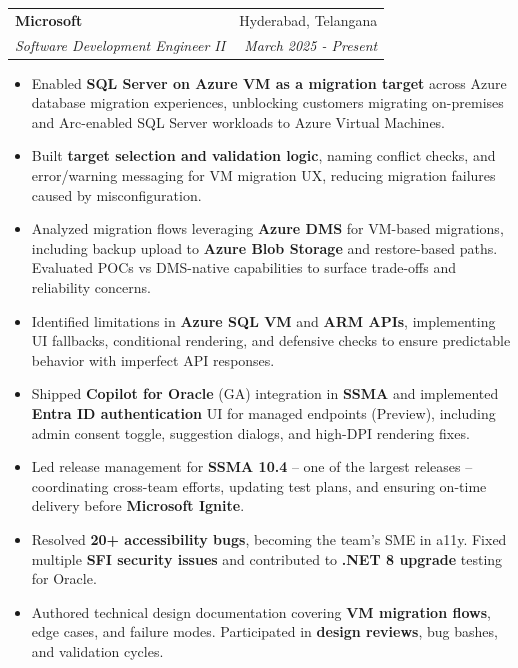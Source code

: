 \documentclass[letterpaper,11pt]{article}
\makeatletter
\newcommand{\resumeItem}[1]{
  \item\small{
    {#1 \vspace{-2pt}}
  }
}
\newcommand{\resumeSubheading}[4]{
  \vspace{-2pt}\item
    \begin{tabular*}{0.97\textwidth}[t]{l@{\extracolsep{\fill}}r}
      \textbf{#1} & #2 \\
      \textit{\small#3} & \textit{\small #4} \\
    \end{tabular*}\vspace{-7pt}
}
\newcommand{\resumeItemListStart}{\begin{itemize}}
\newcommand{\resumeItemListEnd}{\end{itemize}\vspace{-5pt}}
\makeatother
\begin{document}
    \resumeSubheading
          {Microsoft}{Hyderabad, Telangana}
          {Software Development Engineer II}{March 2025 - Present}
          \resumeItemListStart
            \resumeItem{Enabled \textbf{SQL Server on Azure VM as a migration target} across Azure database migration experiences, unblocking customers migrating on-premises and Arc-enabled SQL Server workloads to Azure Virtual Machines.}
            \resumeItem{Built \textbf{target selection and validation logic}, naming conflict checks, and error/warning messaging for VM migration UX, reducing migration failures caused by misconfiguration.}
            \resumeItem{Analyzed migration flows leveraging \textbf{Azure DMS} for VM-based migrations, including backup upload to \textbf{Azure Blob Storage} and restore-based paths. Evaluated POCs vs DMS-native capabilities to surface trade-offs and reliability concerns.}
            \resumeItem{Identified limitations in \textbf{Azure SQL VM} and \textbf{ARM APIs}, implementing UI fallbacks, conditional rendering, and defensive checks to ensure predictable behavior with imperfect API responses.}
            \resumeItem{Shipped \textbf{Copilot for Oracle} (GA) integration in \textbf{SSMA} and implemented \textbf{Entra ID authentication} UI for managed endpoints (Preview), including admin consent toggle, suggestion dialogs, and high-DPI rendering fixes.}
            \resumeItem{Led release management for \textbf{SSMA 10.4} -- one of the largest releases -- coordinating cross-team efforts, updating test plans, and ensuring on-time delivery before \textbf{Microsoft Ignite}.}
            \resumeItem{Resolved \textbf{20+ accessibility bugs}, becoming the team's SME in a11y. Fixed multiple \textbf{SFI security issues} and contributed to \textbf{.NET 8 upgrade} testing for Oracle.}
            \resumeItem{Authored technical design documentation covering \textbf{VM migration flows}, edge cases, and failure modes. Participated in \textbf{design reviews}, bug bashes, and validation cycles.}
          \resumeItemListEnd
          
\end{document}
